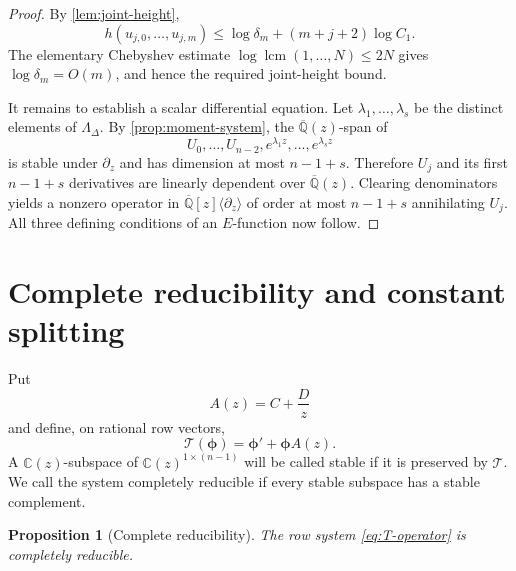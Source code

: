 \documentclass[11pt]{article}
\numberwithin{equation}{section}
\newtheorem{proposition}[proposition]{Proposition}
\theoremstyle{definition}
\theoremstyle{remark}
\newcommand{\C}{\mathbb C}
\newcommand{\Qbar}{\overline{\mathbb Q}}
\begin{document}
\begin{proof}
By \cref{lem:joint-height},
\[
  h(u_{j,0},\ldots,u_{j,m})
  \le\log\delta_m+(m+j+2)\log C_1.
\]
The elementary Chebyshev estimate
$\log\operatorname{lcm}(1,\ldots,N)\le2N$ gives
$\log\delta_m=O(m)$, and hence the required joint-height bound.

It remains to establish a scalar differential equation.  Let
$\lambda_1,\ldots,\lambda_s$ be the distinct elements of
$\Lambda_\Delta$.  By \cref{prop:moment-system}, the $\Qbar(z)$-span of
\[
  U_0,\ldots,U_{n-2},
  e^{\lambda_1z},\ldots,e^{\lambda_sz}
\]
is stable under $\partial_z$ and has dimension at most $n-1+s$.  Therefore
$U_j$ and its first $n-1+s$ derivatives are linearly dependent over
$\Qbar(z)$.  Clearing denominators yields a nonzero operator in
$\Qbar[z]\langle\partial_z\rangle$ of order at most $n-1+s$ annihilating
$U_j$.  All three defining conditions of an $E$-function now follow.
\end{proof}

\section{Complete reducibility and constant splitting}
\label{sec:constant-splitting}

Put
\begin{equation}\label{eq:A-matrix}
  A(z)=C+\frac Dz
\end{equation}
and define, on rational row vectors,
\begin{equation}\label{eq:T-operator}
  \mathcal T(\boldsymbol\phi)
  =\boldsymbol\phi'+\boldsymbol\phi A(z).
\end{equation}
A $\C(z)$-subspace of $\C(z)^{1\times(n-1)}$ will be called stable if it is
preserved by $\mathcal T$.  We call the system completely reducible if every
stable subspace has a stable complement.

\begin{proposition}[Complete reducibility]\label{prop:complete-reducibility}
The row system \eqref{eq:T-operator} is completely reducible.
\end{proposition}
\end{document}
